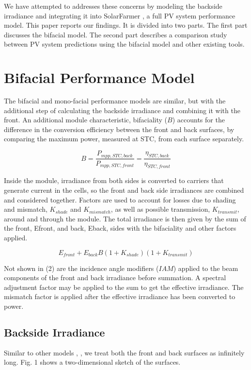 \documentclass[conference]{IEEEtran}
\begin{document}
We have attempted to addresses these concerns by modeling the backside irradiance and integrating it into SolarFarmer \cite{Mikofski_8547323}, a full PV system performance model.  This paper reports our findings.  It is divided into two parts.  The first part discusses the bifacial model.  The second part describes a comparison study between PV system predictions using the bifacial model and other existing tools.\\


\section{Bifacial Performance Model}
The bifacial and mono-facial performance models are similar, but with the additional step of calculating the backside irradiance and combining it with the front.  An additional module characteristic, bifaciality ($B$) accounts for the difference in the conversion efficiency between the front and back surfaces, by comparing the maximum power, measured at STC, from each surface separately.

\begin{equation}
B=\frac{P_{mpp,STC,back}}{P_{mpp,STC,front}}=\frac{\eta_{STC,back}}{\eta_{STC,front}}
\end{equation}

Inside the module, irradiance from both sides is converted to carriers that generate current in the cells, so the front and back side irradiances are combined and considered together.  Factors are used to account for losses due to shading and mismatch, $K_{shade}$ and $K_{mismatch}$, as well as possible transmission, $K_{transmit}$, around and through the module.  The total irradiance is then given by the sum of the front, Efront, and back, Eback, sides with the bifaciality and other factors applied.

\begin{equation}
E_{front} + E_{back} B \left(1 + K_{shade}\right)\left(1 + K_{transmit}\right)
\end{equation}

Not shown in (2) are the incidence angle modifiers ($IAM$) applied to the beam components of the front and back irradiance before summation. A spectral adjustment factor may be applied to the sum to get the effective irradiance.  The mismatch factor is applied after the effective irradiance has been converted to power.

\subsection{ Backside Irradiance }
Similar to other models \cite{Marion2017}, \cite{Anoma2017}, we treat both the front and back surfaces as infinitely long. Fig. 1 shows a two-dimensional sketch of the surfaces.
\end{document}
